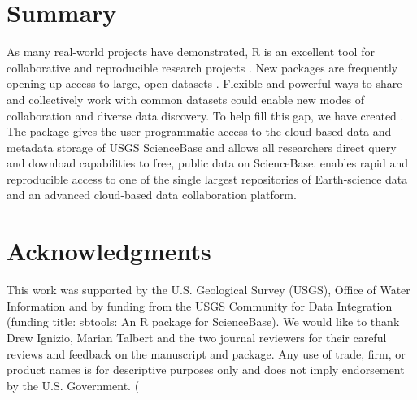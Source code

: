 \section{Summary}

As many real-world projects have demonstrated, R is
an excellent tool for collaborative and reproducible
research projects \citep{Gandrud2013}. New packages are
frequently opening up access to large, open datasets 
\citep{rNOMADS, rFDSN}. Flexible and powerful
ways to share and collectively work with common datasets
could enable new modes of collaboration and diverse data discovery.
To help fill this gap, we have created . 
The  package gives the user programmatic access to the
cloud-based data and metadata storage of USGS ScienceBase
and allows all researchers direct query and download
capabilities to free, public data on ScienceBase.
 enables rapid and reproducible
access to one of the single
largest repositories of Earth-science data and an advanced
cloud-based data collaboration platform.

\section{Acknowledgments}

This work was supported by the U.S. Geological Survey (USGS), Office of 
Water Information and by funding from the USGS Community for Data Integration
(funding title: sbtools: An R package for ScienceBase). 
We would like to thank Drew Ignizio, Marian Talbert and the two journal reviewers
for their careful reviews and feedback on the manuscript and package. Any use of trade, 
firm, or product names is for descriptive purposes only and does not imply endorsement 
by the U.S. Government.
(